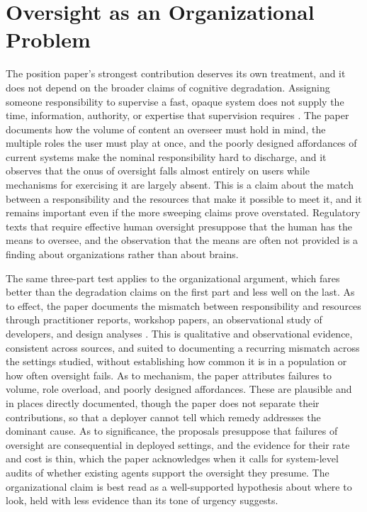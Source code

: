 \documentclass[11pt]{article}
\begin{document}
\section{Oversight as an Organizational Problem}

The position paper's strongest contribution deserves its own treatment, and it does not depend on the broader claims of cognitive degradation. Assigning someone responsibility to supervise a fast, opaque system does not supply the time, information, authority, or expertise that supervision requires \cite{mitchell}. The paper documents how the volume of content an overseer must hold in mind, the multiple roles the user must play at once, and the poorly designed affordances of current systems make the nominal responsibility hard to discharge, and it observes that the onus of oversight falls almost entirely on users while mechanisms for exercising it are largely absent. This is a claim about the match between a responsibility and the resources that make it possible to meet it, and it remains important even if the more sweeping claims prove overstated. Regulatory texts that require effective human oversight presuppose that the human has the means to oversee, and the observation that the means are often not provided is a finding about organizations rather than about brains.

The same three-part test applies to the organizational argument, which fares better than the degradation claims on the first part and less well on the last. As to effect, the paper documents the mismatch between responsibility and resources through practitioner reports, workshop papers, an observational study of developers, and design analyses \cite{mitchell}. This is qualitative and observational evidence, consistent across sources, and suited to documenting a recurring mismatch across the settings studied, without establishing how common it is in a population or how often oversight fails. As to mechanism, the paper attributes failures to volume, role overload, and poorly designed affordances. These are plausible and in places directly documented, though the paper does not separate their contributions, so that a deployer cannot tell which remedy addresses the dominant cause. As to significance, the proposals presuppose that failures of oversight are consequential in deployed settings, and the evidence for their rate and cost is thin, which the paper acknowledges when it calls for system-level audits of whether existing agents support the oversight they presume. The organizational claim is best read as a well-supported hypothesis about where to look, held with less evidence than its tone of urgency suggests.
\end{document}
